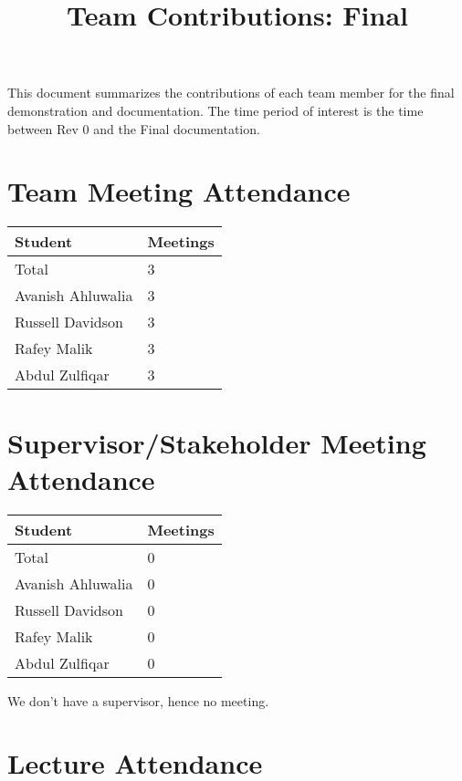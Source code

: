 \documentclass{article}
\title{Team Contributions: Final\\\progname}
\author{\authname}
\date{}
\begin{document}
\maketitle

This document summarizes the contributions of each team member for the final
demonstration and documentation.  The time period of interest is the time
between Rev 0 and the Final documentation.

\section{Team Meeting Attendance}

\begin{table}[H]
\centering
\begin{tabular}{ll}
\toprule
\textbf{Student} & \textbf{Meetings}\\
\midrule
Total & 3\\
Avanish Ahluwalia & 3\\
Russell Davidson & 3\\
Rafey Malik & 3\\
Abdul Zulfiqar & 3\\
\bottomrule
\end{tabular}
\end{table}

\section{Supervisor/Stakeholder Meeting Attendance}

\begin{table}[H]
\centering
\begin{tabular}{ll}
\toprule
\textbf{Student} & \textbf{Meetings}\\
\midrule
Total & 0\\
Avanish Ahluwalia & 0\\
Russell Davidson & 0\\
Rafey Malik & 0\\
Abdul Zulfiqar & 0\\
\bottomrule
\end{tabular}
\end{table}

We don't have a supervisor, hence no meeting.

\section{Lecture Attendance}
\end{document}
